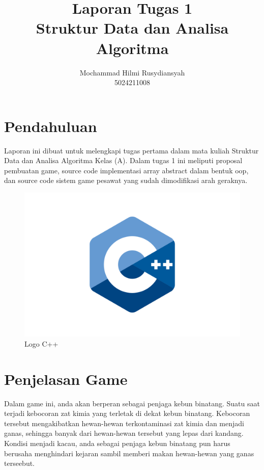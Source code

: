 \documentclass[11pt]{article} %
\title{Laporan Tugas 1\\Struktur Data dan Analisa Algoritma}
\author{Mochammad Hilmi Rusydiansyah\\5024211008}
\begin{document}
	\maketitle
		
	\section{Pendahuluan}
	Laporan ini dibuat untuk melengkapi tugas pertama dalam mata kuliah Struktur Data dan Analisa Algoritma Kelas (A). Dalam tugas 1 ini meliputi proposal pembuatan game, source code implementasi array abstract dalam bentuk oop, dan source code sistem game pesawat yang sudah dimodifikasi arah geraknya.
	\begin{figure}[h!]
		\centering
		\includegraphics[width=0.4\linewidth]{C++-Logo}
		\caption{Logo C++}
		\label{fig:C++-Logo}
	\end{figure}
	
	\section{Penjelasan Game}
	Dalam game ini, anda akan berperan sebagai penjaga kebun binatang. Suatu saat terjadi kebocoran zat kimia yang terletak di dekat kebun binatang. Kebocoran tersebut mengakibatkan hewan-hewan terkontaminasi zat kimia dan menjadi ganas, sehingga banyak dari hewan-hewan tersebut yang lepas dari kandang. Kondisi menjadi kacau, anda sebagai penjaga kebun binatang pun harus berusaha menghindari kejaran sambil memberi makan hewan-hewan yang ganas terseebut.
	
\end{document}
